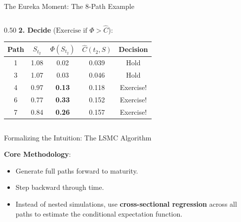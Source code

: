 \documentclass[10pt,aspectratio=169]{beamer}
\begin{document}
\begin{frame}{The Eureka Moment: The 8-Path Example}
\begin{columns}[T]
\begin{column}{0.50\textwidth}
\textbf{2. Decide} ($\text{Exercise if } \Phi > \hat{C}$):
\begin{center}
\renewcommand{\arraystretch}{1.1}
\setlength{\tabcolsep}{3pt} 
\begin{tabular}{c|c|c|c|c}
\toprule
\textbf{Path} & $S_{t_2}$ & $\Phi(S_{t_2})$ & $\hat{C}(t_2,S)$ & \textbf{Decision} \\
\midrule
1 & 1.08 & 0.02 & 0.039 & Hold \\
3 & 1.07 & 0.03 & 0.046 & Hold \\
\rowcolor{gray!20}4 & 0.97 & \textbf{0.13} & 0.118 & \alert{Exercise!} \\
\rowcolor{gray!20}6 & 0.77 & \textbf{0.33} & 0.152 & \alert{Exercise!} \\
\rowcolor{gray!20}7 & 0.84 & \textbf{0.26} & 0.157 & \alert{Exercise!} \\
\bottomrule
\end{tabular}
\end{center}
\end{column}
\end{columns}
\end{frame}

\begin{frame}{Formalizing the Intuition: The LSMC Algorithm}

\vspace{0.4cm}
\begin{center}
\end{center}

\vspace{0.6cm}
\textbf{Core Methodology}:
\begin{itemize}
    \item Generate full paths forward to maturity.
    \item Step backward through time.
    \item Instead of nested simulations, use \textbf{cross-sectional regression} across all paths to estimate the conditional expectation function.
\end{itemize}
\end{frame}
\end{document}
